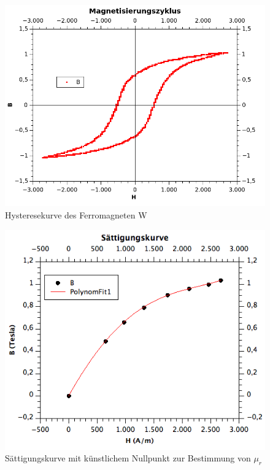 \documentclass[12pt,a4paper]{article}
\begin{document}
\begin{figure}[H]
	\centering
	\includegraphics[scale=1]{./figures/Trafo_W_Hysterese.png}
	\caption{Hysteresekurve des Ferromagneten W}
	\label{fig:Trafo_W_Hysterese}
\end{figure}
\begin{figure}[H]
	\centering
	\includegraphics[scale=0.7]{./figures/Trafo_W_saettigung02.png}
	\caption{Sättigungskurve mit künstlichem Nullpunkt zur Bestimmung von $\mu_r$}
	\label{fig:Trafo_W_saettigung}
\end{figure}
\end{document}
